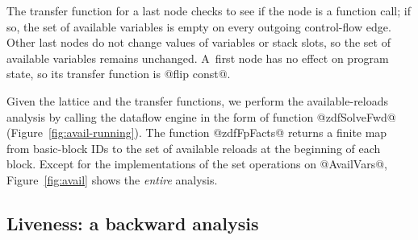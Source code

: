 \documentclass[blockstyle,preprint,nocopyrightspace]{sigplanconf}
\newcommand{\authornote}[1]{{\em #1}}
\def\authornote#1{\unskip\relax}
\newcommand{\simon}[1]{\authornote{SLPJ: #1}}
\newcommand\figref[1]{Figure~\ref{fig:#1}}
\begin{document}
The transfer function for a last node checks to see if the node is a
function call; if so, the set of
available variables is empty on every outgoing control-flow edge.
Other last nodes do not change values of variables or stack slots, 
so the set of available variables remains unchanged.
%
A~first node has no effect on program state, so its transfer function
is @flip const@.


Given the lattice and the transfer functions,
we perform the available-reloads analysis by calling
the dataflow engine in the form of function @zdfSolveFwd@
(\figref{avail-running}).
The function @zdfFpFacts@ returns 
a finite map from basic-block IDs to the set of available reloads
at the beginning of each block.
Except for the implementations of the set operations on @AvailVars@,
\figref{avail} shows the \emph{entire} analysis.

\subsection{Liveness: a backward analysis} 
\simon{To my mind 4.2 is easier to understand than 4.1. It's a totally
well-known analysis.  Can we re-order to put it first?
Fine by me ---NR}
\simon{Same question as in current 4.1: what is the connection to
passes 1,2,3?  Irrelevant: the analysis should stand on its own ---NR.
SLPJ responds: Not irrelevant to the reader!  I expect 4.2 to follow in some way
from 4.0 (the bit before 4.1).  
Indeed we say (start of 4) ``In~this section we provide evidence for that claim by showing
implementations of two analyses...that help solve a real problem in GHC''.
So presumably this analysis is somehow connected to 4.0.}
\end{document}
